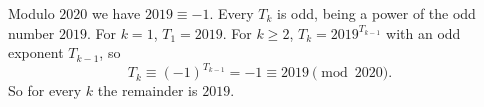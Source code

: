 Modulo $2020$ we have $2019\equiv-1$. Every $T_k$ is odd, being a power of the odd number $2019$. For $k=1$, $T_1=2019$. For $k\ge2$, $T_k=2019^{T_{k-1}}$ with an odd exponent $T_{k-1}$, so
\[
T_k\equiv(-1)^{T_{k-1}}=-1\equiv2019\pmod{2020}.
\]
So for every $k$ the remainder is $\boxed{2019}$.
